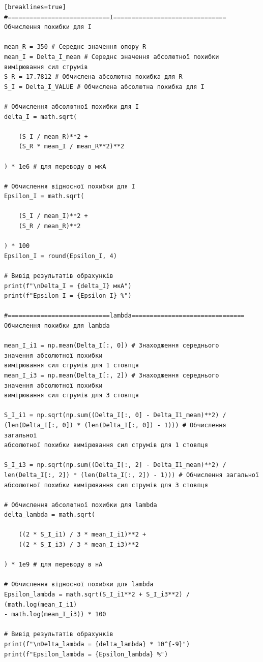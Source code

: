 \documentclass[12pt,a4paper]{article}
\begin{document}
{\begin{verbatim}[breaklines=true]
#============================I===============================
Обчислення похибки для I

mean_R = 350 # Середнє значення опору R
mean_I = Delta_I_mean # Середнє значення абсолютної похибки вимірювання сил струмів
S_R = 17.7812 # Обчислена абсолютна похибка для R
S_I = Delta_I_VALUE # Обчислена абсолютна похибка для I

# Обчислення абсолютної похибки для I
delta_I = math.sqrt(

    (S_I / mean_R)**2 +
    (S_R * mean_I / mean_R**2)**2

) * 1e6 # для переводу в мкА

# Обчислення відносної похибки для I
Epsilon_I = math.sqrt(

    (S_I / mean_I)**2 +
    (S_R / mean_R)**2

) * 100
Epsilon_I = round(Epsilon_I, 4)

# Вивід результатів обрахунків
print(f"\nDelta_I = {delta_I} мкА")
print(f"Epsilon_I = {Epsilon_I} %")

#============================lambda===============================
Обчислення похибки для lambda

mean_I_i1 = np.mean(Delta_I[:, 0]) # Знаходження середнього
значення абсолютної похибки
вимірювання сил струмів для 1 стовпця
mean_I_i3 = np.mean(Delta_I[:, 2]) # Знаходження середнього
значення абсолютної похибки
вимірювання сил струмів для 3 стовпця

S_I_i1 = np.sqrt(np.sum((Delta_I[:, 0] - Delta_I1_mean)**2) /
(len(Delta_I[:, 0]) * (len(Delta_I[:, 0]) - 1))) # Обчислення загальної
абсолютної похибки вимірювання сил струмів для 1 стовпця

S_I_i3 = np.sqrt(np.sum((Delta_I[:, 2] - Delta_I1_mean)**2) / 
len(Delta_I[:, 2]) * (len(Delta_I[:, 2]) - 1))) # Обчислення загальної
абсолютної похибки вимірювання сил струмів для 3 стовпця

# Обчислення абсолютної похибки для lambda
delta_lambda = math.sqrt(

    ((2 * S_I_i1) / 3 * mean_I_i1)**2 +
    ((2 * S_I_i3) / 3 * mean_I_i3)**2

) * 1e9 # для переводу в нА

# Обчислення відносної похибки для lambda
Epsilon_lambda = math.sqrt(S_I_i1**2 + S_I_i3**2) / (math.log(mean_I_i1)
- math.log(mean_I_i3)) * 100

# Вивід результатів обрахунків
print(f"\nDelta_lambda = {delta_lambda} * 10^{-9}")
print(f"Epsilon_lambda = {Epsilon_lambda} %")
    \end{verbatim}}
\end{document}
